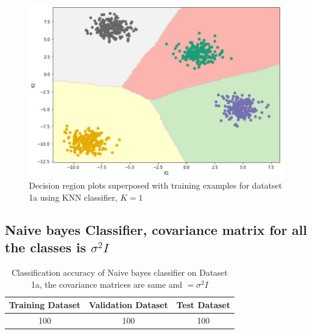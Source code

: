 \documentclass[11pt]{article}
\begin{document}
\begin{figure}[h]
\centering
\includegraphics[scale=0.4]{dataset1a_knn.jpg}	
\caption{Decision region plots superposed with training examples for datatset 1a using KNN classifier, $K=1$}
\label{fig:fig1.1.1}
\end{figure}

\newpage
\subsection{Naive bayes Classifier, covariance matrix for all the classes is $\sigma^2I$}

\begin{table}[h!]
\label{tab:tab1.1.1}
\begin{center}
\begin{tabular}{|c|c|c|}
\hline
\textbf{Training Dataset} & \textbf{Validation Dataset} &\textbf{Test Dataset}\\
\hline
100 & 100 & 100\\
\hline
\end{tabular}
\caption{Classification accuracy of Naive bayes classifier on Dataset 1a, the covariance matrices are same and $=\sigma^2I$}
\end{center}
\end{table}
\end{document}

